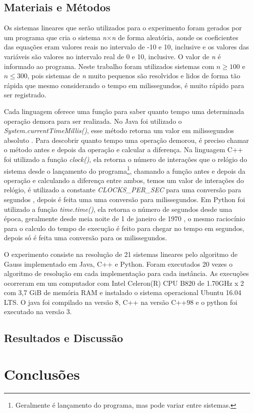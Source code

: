 \documentclass[12pt]{article}
\begin{document}

\subsection{Materiais e Métodos}

Os sistemas lineares que serão utilizados para o experimento foram gerados por um programa que cria o sistema \textit{n}$\times$\textit{n} de forma aleatória, aonde os coeficientes das equações eram valores reais no intervalo de -10 e 10, inclusive e os valores das variáveis são valores no intervalo real de 0 e 10, inclusive. O valor de \textit{n} é informado ao programa. Neste trabalho foram utilizados sistemas com $n \geq 100$ e $n \leq 300$, pois sistemas de \textit{n} muito pequenos são resolvidos e lidos de forma tão rápida que mesmo considerando o tempo em milissegundos, é muito rápido para ser registrado.

Cada linguagem oferece uma função para saber quanto tempo uma determinada operação demora para ser realizada. No Java foi utilizado o \textit{System.currentTimeMillis()}, esse método retorna um valor em milissegundos absoluto \cite{timeJava}. Para descobrir quanto tempo uma operação demorou, é preciso chamar o método antes e depois da operação e calcular a diferença. Na linguagem C++ foi utilizado a função \textit{clock()}, ela retorna o número de interações que o relógio do sistema desde o lançamento do programa\footnote{Geralmente é lançamento do programa, mas pode variar entre sistemas.}\cite{clockCPP}, chamando a função antes e depois da operação e calculando a diferença entre ambos, temos um valor de interações do relógio, é utilizado a constante \textit{CLOCKS\_PER\_SEC} para uma conversão para segundos \cite{macroCPP}, depois é feita uma uma conversão para milissegundos. Em Python foi utilizado a função \textit{time.time()}, ela retorna o número de segundos desde uma época, geralmente desde meia noite de 1 de janeiro de 1970 \cite{timePython}, o mesmo raciocínio para o calculo do tempo de execução é feito para chegar no tempo em segundos, depois só é feita uma conversão para os milissegundos.

O experimento consiste na resolução de 21 sistemas lineares pelo algoritmo de Gauss implementado em Java, C++ e Python. Foram executados 20 vezes o algoritmo de resolução em cada implementação para cada instância. As execuções ocorreram em um computador com Intel Celeron(R) CPU B820 de 1.70GHz x 2 com 3,7 GiB de memória RAM e instalado o sistema operacional Ubuntu 16.04 LTS. O java foi compilado na versão 8, C++ na versão C++98 e o python foi executado na versão 3.

\subsection{Resultados e Discussão}






\section{Conclusões}




\end{document}
